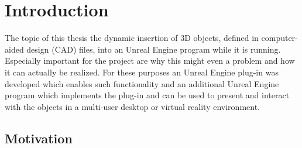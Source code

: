 \chapter{Introduction}
The topic of this thesis the dynamic insertion of 3D objects, defined in computer-aided design (\acs{CAD}) files, into an Unreal Engine program while it is running. Especially important for the project are why this might even a problem and how it can actually be realized. For these purposes an Unreal Engine plug-in was developed which enables such functionality and an additional Unreal Engine program which implements the plug-in and can be used to present and interact with the objects in a multi-user desktop or virtual reality environment.

\section{Motivation}

